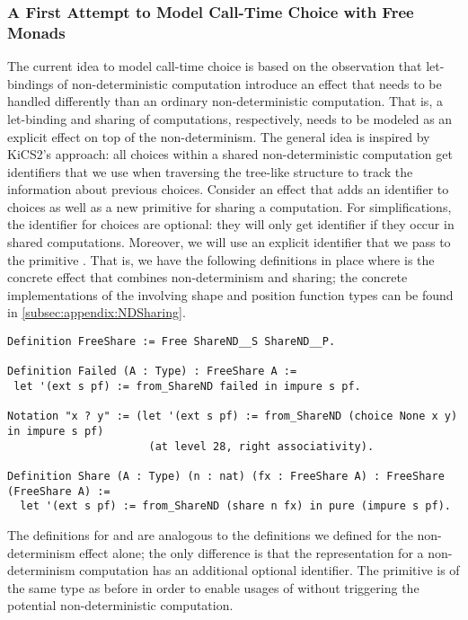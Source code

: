 \subsubsection{A First Attempt to Model Call-Time Choice with Free
  Monads}
\label{subsubsec:modelcalltime}

The current idea to model call-time choice is based on the observation that let-bindings of non-deterministic computation introduce an effect that needs to be handled differently than an ordinary non-deterministic computation.
That is, a let-binding and sharing of computations, respectively, needs to be modeled as an explicit effect on top of the
non-determinism.
The general idea is inspired by KiCS2's approach: all choices within a shared non-deterministic computation get identifiers that we use when traversing the tree-like structure to track the information about previous choices.
Consider an effect  that adds an identifier to choices as well as a new primitive for sharing a computation.
For simplifications, the identifier for choices are optional: they will only get identifier if they occur in shared computations.
Moreover, we will use an explicit identifier that we pass to the primitive .
That is, we have the following definitions in place where  is the concrete effect that combines non-determinism
and sharing; the concrete implementations of the involving shape and position function types can be found in \autoref{subsec:appendix:NDSharing}.

\begin{verbatim}
Definition FreeShare := Free ShareND__S ShareND__P.

Definition Failed (A : Type) : FreeShare A :=
 let '(ext s pf) := from_ShareND failed in impure s pf.

Notation "x ? y" := (let '(ext s pf) := from_ShareND (choice None x y) in impure s pf)
                      (at level 28, right associativity).

Definition Share (A : Type) (n : nat) (fx : FreeShare A) : FreeShare (FreeShare A) :=
  let '(ext s pf) := from_ShareND (share n fx) in pure (impure s pf).
\end{verbatim}

The definitions for  and  are analogous to the definitions we defined for the non-determinism effect alone; the only difference is that the representation for a non-determinism computation has an additional optional identifier.
The  primitive is of the same type as before in order to enable usages of \cinl{>>=} without triggering the potential non-deterministic computation.

